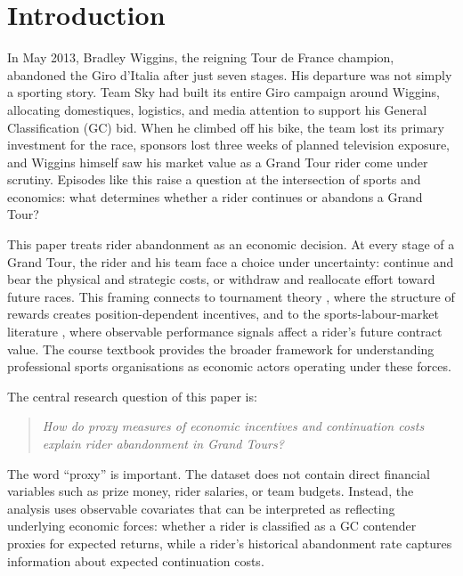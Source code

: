\section{Introduction}

In May 2013, Bradley Wiggins, the reigning Tour de France champion, abandoned the Giro d'Italia after just seven stages. His departure was not simply a sporting story. Team Sky had built its entire Giro campaign around Wiggins, allocating domestiques, logistics, and media attention to support his General Classification (GC) bid. When he climbed off his bike, the team lost its primary investment for the race, sponsors lost three weeks of planned television exposure, and Wiggins himself saw his market value as a Grand Tour rider come under scrutiny. Episodes like this raise a question at the intersection of sports and economics: what determines whether a rider continues or abandons a Grand Tour?

This paper treats rider abandonment as an economic decision. At every stage of a Grand Tour, the rider and his team face a choice under uncertainty: continue and bear the physical and strategic costs, or withdraw and reallocate effort toward future races. This framing connects to tournament theory \parencite{rosen1981superstars, lazear1981rank}, where the structure of rewards creates position-dependent incentives, and to the sports-labour-market literature \parencite{kahn2000labormarket}, where observable performance signals affect a rider's future contract value. The course textbook \parencite{blair2012sports} provides the broader framework for understanding professional sports organisations as economic actors operating under these forces.

The central research question of this paper is:

\begin{quote}
\emph{How do proxy measures of economic incentives and continuation costs explain rider abandonment in Grand Tours?}
\end{quote}

The word ``proxy'' is important. The dataset does not contain direct financial variables such as prize money, rider salaries, or team budgets. Instead, the analysis uses observable covariates that can be interpreted as reflecting underlying economic forces: whether a rider is classified as a GC contender proxies for expected returns, while a rider's historical abandonment rate captures information about expected continuation costs.


